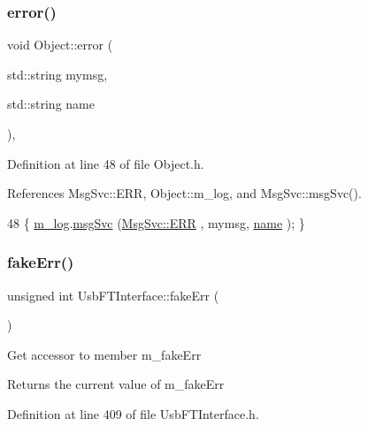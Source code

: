 \subsubsection{\texorpdfstring{error()}{error()}\hspace{0.1cm}{\footnotesize\ttfamily [2/2]}}
{\footnotesize\ttfamily void Object\+::error (\begin{DoxyParamCaption}\item[{std\+::string}]{mymsg,  }\item[{std\+::string}]{name }\end{DoxyParamCaption})\hspace{0.3cm}{\ttfamily [inline]}, {\ttfamily [inherited]}}



Definition at line 48 of file Object.\+h.



References Msg\+Svc\+::\+E\+RR, Object\+::m\+\_\+log, and Msg\+Svc\+::msg\+Svc().


\begin{DoxyCode}
48 \{ \hyperlink{classObject_a0d269813dd7ac1f24bc143031e2963f2}{m\_log}.\hyperlink{classMsgSvc_ad25f18047920cc59a314e5098259711c}{msgSvc} (\hyperlink{classMsgSvc_ae671eb7301996cd049d2da8a65925926a35a9d7166e9896af4ec8fb33bf5f1772}{MsgSvc::ERR}     , mymsg, \hyperlink{classObject_a300f4c05dd468c7bb8b3c968868443c1}{name} ); \}
\end{DoxyCode}
\mbox{\label{classUsbFTInterface_abb29c7f73506259ef57d1e25204f8f7c}} 
\subsubsection{\texorpdfstring{fake\+Err()}{fakeErr()}}
{\footnotesize\ttfamily unsigned int Usb\+F\+T\+Interface\+::fake\+Err (\begin{DoxyParamCaption}{ }\end{DoxyParamCaption})\hspace{0.3cm}{\ttfamily [inline]}}

Get accessor to member m\+\_\+fake\+Err \begin{DoxyReturn}{Returns}
the current value of m\+\_\+fake\+Err 
\end{DoxyReturn}


Definition at line 409 of file Usb\+F\+T\+Interface.\+h.




